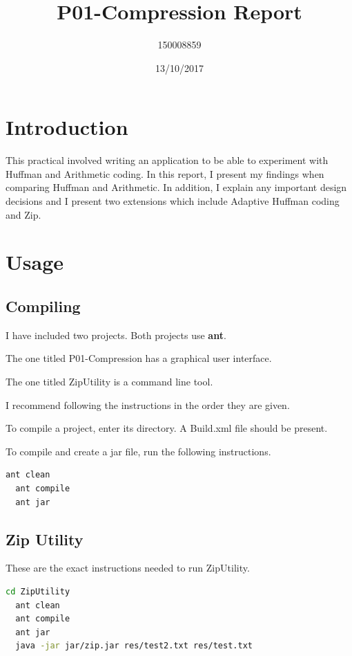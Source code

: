 \documentclass{article}
\title{P01-Compression  Report}
\date{13/10/2017}
\author{150008859}
\begin{document}
\maketitle
\newpage

\section{Introduction}

This practical involved writing an application to be able to experiment with Huffman and Arithmetic coding. In this report, I present my findings when comparing Huffman and Arithmetic. In addition, I explain any important design decisions and I present two extensions which include Adaptive Huffman coding and Zip.

\section{Usage}

\subsection{Compiling}

I have included two projects. Both projects use \textbf{ant}.

The one titled P01-Compression has a graphical user interface.

The one titled ZipUtility is a command line tool.

I recommend following the instructions in the order they are given. 

To compile a project, enter its directory. A Build.xml file should be present.

To compile and create a jar file, run the following instructions.
\begin{lstlisting}[language=bash]
  ant clean
  ant compile
  ant jar
\end{lstlisting}

\subsection{Zip Utility}

These are the exact instructions needed to run ZipUtility. 

\begin{lstlisting}[language=bash]
  cd ZipUtility
  ant clean
  ant compile
  ant jar
  java -jar jar/zip.jar res/test2.txt res/test.txt
\end{lstlisting}
\end{document}
